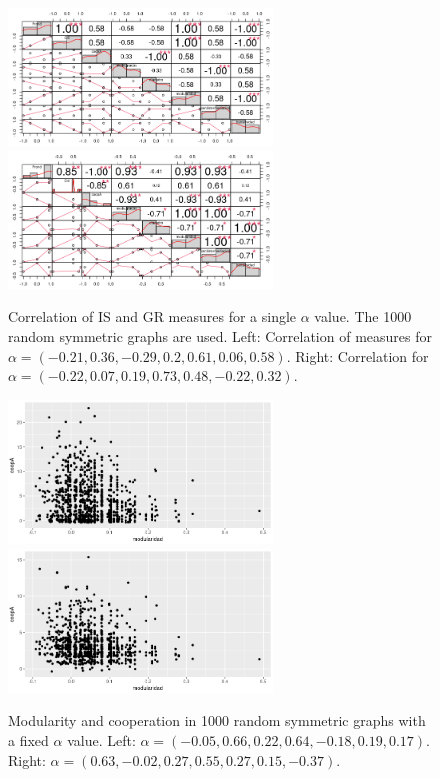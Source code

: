 \documentclass{article}
\begin{document}
\begin{figure}[htbp!]
  \centering{}
  \includegraphics[width=7cm]{img/corrS1000A07}\quad\quad
  \includegraphics[width=7cm]{img/corrS1000A10}
  \caption{Correlation of IS and GR measures for a single $\alpha$
    value. The 1000 random symmetric graphs are used. Left:
    Correlation of measures for $\alpha = (-0.21, 0.36, -0.29, 0.2, 0.61, 0.06, 0.58)$. Right: Correlation for
    $\alpha = (-0.22, 0.07, 0.19, 0.73, 0.48, -0.22, 0.32)$.}
  \label{fig:corrDiffAlphas}
\end{figure}


\begin{figure}[htbp!]
  \centering{}
  \includegraphics[width=7cm]{img/coopModS1000A11}\quad\quad
  \includegraphics[width=7cm]{img/coopModS1000A15}
  \caption{Modularity and cooperation in 1000 random symmetric graphs
    with a fixed $\alpha$ value. Left: $\alpha = (-0.05, 0.66, 0.22,
    0.64, -0.18, 0.19, 0.17)$. Right: $\alpha = (0.63, -0.02, 0.27,
    0.55, 0.27, 0.15, -0.37)$.} 
  \label{fig:coopModS1000DiffAlphas}
\end{figure}
\end{document}
